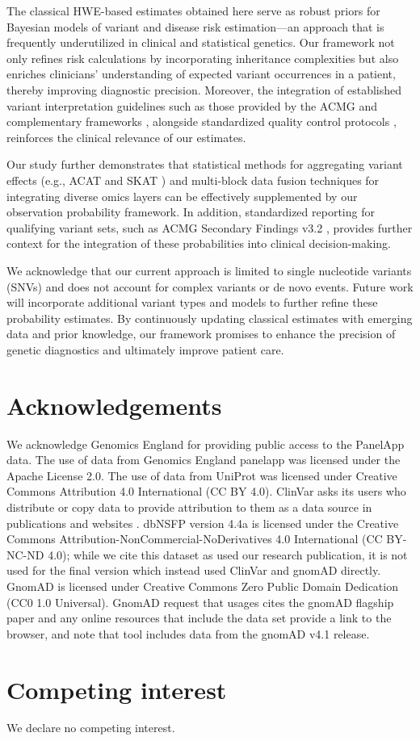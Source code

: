 The classical HWE-based estimates obtained here serve as robust priors for Bayesian models of variant and disease risk estimation—an approach that is frequently underutilized in clinical and statistical genetics. Our framework not only refines risk calculations by incorporating inheritance complexities but also enriches clinicians’ understanding of expected variant occurrences in a patient, thereby improving diagnostic precision. Moreover, the integration of established variant interpretation guidelines such as those provided by the ACMG \citep{richards2015standards} and complementary frameworks \citep{tavtigian2020fitting,li2017intervar}, alongside standardized quality control protocols \citep{pedersen2021effective,anderson2010data}, reinforces the clinical relevance of our estimates.

Our study further demonstrates that statistical methods for aggregating variant effects (e.g., ACAT and SKAT \citep{liu2019acat,li2020dynamic,wu2011rare,lee2012optimal}) and multi-block data fusion techniques for integrating diverse omics layers \citep{kong2018nature,howe2021within} can be effectively supplemented by our observation probability framework. In addition, standardized reporting for qualifying variant sets, such as ACMG Secondary Findings v3.2 \citep{miller2023acmg}, provides further context for the integration of these probabilities into clinical decision-making.

We acknowledge that our current approach is limited to single nucleotide variants (SNVs) and does not account for complex variants or de novo events. Future work will incorporate additional variant types and models to further refine these probability estimates. By continuously updating classical estimates with emerging data and prior knowledge, our framework promises to enhance the precision of genetic diagnostics and ultimately improve patient care.

\section*{Acknowledgements}
\noindent
We acknowledge Genomics England for providing public access to the PanelApp data.
The use of data from Genomics England panelapp was licensed under the Apache License 2.0.
The use of data from UniProt was licensed under Creative Commons Attribution 4.0 International (CC BY 4.0).
ClinVar asks its users who distribute or copy data to provide attribution to them as a data source in publications and websites \cite{landrum_clinvar_2018}.
dbNSFP version 4.4a is licensed under the Creative Commons Attribution-NonCommercial-NoDerivatives 4.0 International (CC BY-NC-ND 4.0); while we cite this dataset as used our research publication, it is not used for the final version which instead used ClinVar and gnomAD directly.
GnomAD is licensed under  Creative Commons  Zero Public Domain Dedication (CC0 1.0 Universal).
GnomAD request that usages cites the gnomAD flagship paper \cite{karczewski2020mutational}
and any online resources that include the data set provide a link to the browser, and note that tool includes data from the gnomAD v4.1 release.

\section*{Competing interest}
\noindent
We declare no competing interest. 

\newpage




